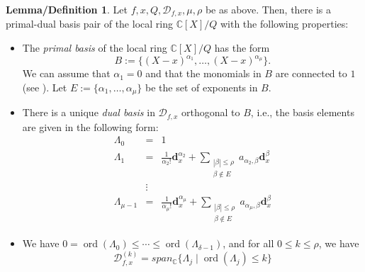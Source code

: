\documentclass[12pt,oneside,reqno]{amsart}
\theoremstyle{definition}
\newtheorem{lemdef}[thm]{Lemma/Definition}
\newcommand{\CC}{\mathbb{C}}
\DeclareMathOperator{\ord}{ord}
\begin{document}
\begin{lemdef}\cite[Lemma 4.1]{hauenstein2015certifying}
	Let $f,x,Q,\mathcal{D}_{f,x},\mu, \rho$ be as above. Then, there is a primal-dual basis pair of the local ring $\mathbb{C}[X]/Q$ with the following properties:
	\begin{itemize}
		\item The {\it primal basis} of the local ring $\mathbb{C}[X]/Q$ has the form
		\[B:=\{(X-x)^{\alpha_1},\dots, (X-x)^{\alpha_\mu}\}.\]
		We can assume that $\alpha_1=0$ and that the monomials in $B$ are connected to $1$ (see \cite{mourrain1999new}). Let $E:=\{\alpha_1,\dots, \alpha_\mu\}$ be the set of exponents in $B$.
		\item There is a unique {\it dual basis} in $\mathcal{D}_{f,x}$ orthogonal to $B$, i.e., the basis elements are given in the following form:
		\begin{eqnarray*}
		\Lambda_0 & = & 1\\
		\Lambda_1 & = & \frac{1}{\alpha_2!}\mathbf{d}_x^{\alpha_2}+\sum\limits_{\substack{|\beta|\leq \rho\\ \beta \notin E}}a_{\alpha_2,\beta}\mathbf{d}^\beta_x\\
		&\vdots &\\
		\Lambda_{\mu-1} & = & \frac{1}{\alpha_{\mu}!}\mathbf{d}_x^{\alpha_\mu}+\sum\limits_{\substack{|\beta|\leq \rho\\ \beta \notin E}}a_{\alpha_\mu,\beta}\mathbf{d}^\beta_x		
		\end{eqnarray*}
		\item We have $0=\ord(\Lambda_0)\leq \cdots \leq \ord(\Lambda_{\delta-1})$, and for all $0\leq k \leq \rho$, we have
		\[\mathcal{D}_{f,x}^{(k)}=span_\CC\{\Lambda_j\mid \ord(\Lambda_j)\leq k\}\]
	\end{itemize}
\end{lemdef}

\end{document}
